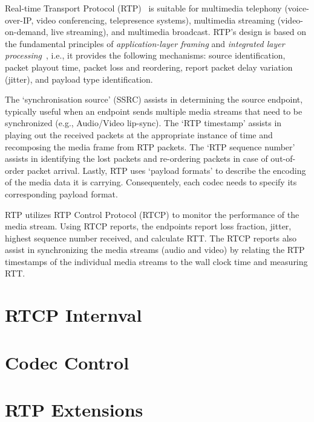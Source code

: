 
Real-time Transport Protocol (RTP)~\cite{rfc3550} is suitable for multimedia
telephony (voice-over-IP, video conferencing, telepresence systems),
multimedia streaming (video-on-demand, live streaming), and multimedia
broadcast. RTP's design is based on the fundamental principles of \textit
{application-layer framing} and \textit{integrated layer
processing}~\cite{clark:alf}, i.e., it provides the following mechanisms:
source identification, packet playout time, packet loss and reordering, report
packet delay variation (jitter), and payload type identification. 

The `synchronisation source' (SSRC) assists in determining the source
endpoint, typically useful when an endpoint sends multiple media streams that
need to be synchronized (e.g., Audio/Video lip-sync). The `RTP timestamp'
assists in playing out the received packets at the appropriate instance of
time and recomposing the media frame from RTP packets. The `RTP sequence
number' assists in identifying the lost packets and re-ordering packets in
case of out-of-order packet arrival. Lastly, RTP uses `payload formats' to
describe the encoding of the media data it is carrying. Consequentely,
each codec needs to specify its corresponding payload format.

RTP utilizes RTP Control Protocol (RTCP) to monitor the performance of the
media stream. Using RTCP reports, the endpoints report loss fraction, jitter,
highest sequence number received, and calculate RTT. The RTCP reports also
assist in synchronizing the media streams (audio and video) by relating the
RTP timestamps of the individual media streams to the wall clock time and
measuring RTT.

\section{RTCP Internval}




\section{Codec Control}

\section{RTP Extensions}
\label{rtp.ext}
